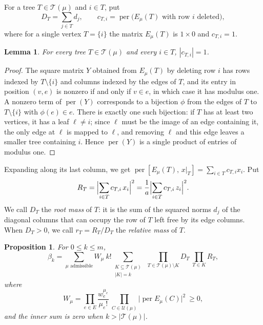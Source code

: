 \documentclass[11pt]{amsart}
\newtheorem{lemma}[theorem]{Lemma}
\newtheorem{proposition}[theorem]{Proposition}
\theoremstyle{remark}
\numberwithin{equation}{section}
\newcommand{\per}{\operatorname{per}}
\newcommand{\cT}{\mathcal{T}}
\newcommand{\cU}{\mathcal{U}}
\begin{document}
For a tree $T\in\cT(\mu)$ and $i\in T$, put
\[
D_T=\sum_{j\in T}d_j,\qquad c_{T,i}=\per\bigl(E_\mu(T)\text{ with row }i\text{ deleted}\bigr),
\]
where for a single vertex $T=\{i\}$ the matrix $E_\mu(T)$ is $1\times0$ and $c_{T,i}=1$.

\begin{lemma}\label{lem:tree}
For every tree $T\in\cT(\mu)$ and every $i\in T$, $|c_{T,i}|=1$.
\end{lemma}

\begin{proof}
The square matrix $Y$ obtained from $E_\mu(T)$ by deleting row $i$ has rows indexed by $T\setminus\{i\}$ and columns indexed by the edges of $T$, and its entry in position $(v,e)$ is nonzero if and only if $v\in e$, in which case it has modulus one. A nonzero term of $\per(Y)$ corresponds to a bijection $\phi$ from the edges of $T$ to $T\setminus\{i\}$ with $\phi(e)\in e$. There is exactly one such bijection: if $T$ has at least two vertices, it has a leaf $\ell\ne i$; since $\ell$ must be the image of an edge containing it, the only edge at $\ell$ is mapped to $\ell$, and removing $\ell$ and this edge leaves a smaller tree containing $i$. Hence $\per(Y)$ is a single product of entries of modulus one.
\end{proof}

Expanding along its last column, we get $\per[E_\mu(T),\,x|_T]=\sum_{i\in T}c_{T,i}x_i$. Put
\begin{equation}\label{eq:RT}
R_T=\Bigl|\sum_{i\in T}c_{T,i}\,x_i\Bigr|^2=\frac1a\Bigl|\sum_{i\in T}c_{T,i}\,z_i\Bigr|^2 .
\end{equation}
We call $D_T$ the \emph{root mass} of $T$: it is the sum of the squared norms $d_j$ of the diagonal columns that can occupy the row of $T$ left free by its edge columns. When $D_T>0$, we call $r_T=R_T/D_T$ the \emph{relative mass} of $T$.

\begin{proposition}\label{prop:forest}
For $0\le k\le m$,
\begin{equation}\label{eq:forest}
\beta_k=\sum_{\mu\text{ admissible}}W_\mu\ k!\sum_{\substack{K\subseteq\cT(\mu)\\ |K|=k}}\ \prod_{T\in\cT(\mu)\setminus K}D_T\ \prod_{T\in K}R_T,
\end{equation}
where
\[
W_\mu=\prod_{e\in E}\frac{w_e^{\mu_e}}{\mu_e!}\ \prod_{C\in\cU(\mu)}\bigl|\per E_\mu(C)\bigr|^2\ \ge0,
\]
and the inner sum is zero when $k>|\cT(\mu)|$.
\end{proposition}
\end{document}
